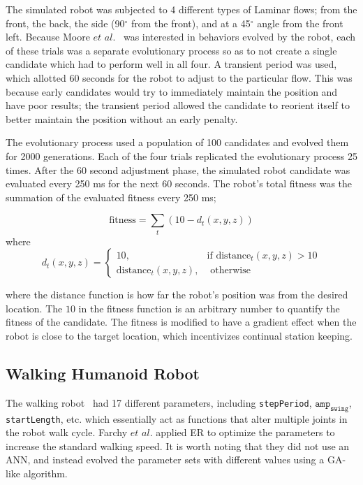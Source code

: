 \documentclass{sig-alternate}
\begin{document}
 The simulated robot was subjected to 4 different types of Laminar flows; from the front, the back, the side (90$^\circ$ from the front), and at a 45$^\circ$ angle from the front left. Because Moore $et$ $al.$~\cite{Moore:2013:ESK:2463372.2463402} was interested in behaviors evolved by the robot, each of these trials was a separate evolutionary process so as to not create a single candidate which had to perform well in all four. A transient period was used, which allotted 60 seconds for the robot to adjust to the particular flow. This was because early candidates would try to immediately maintain the position and have poor results; the transient period allowed the candidate to reorient itself to better maintain the position without an early penalty. 
 
 The evolutionary process used a population of 100 candidates and evolved them for 2000 generations. Each of the four trials replicated the evolutionary process 25 times. After the 60 second adjustment phase, the simulated robot candidate was evaluated every 250 ms for the next 60 seconds. The robot's total fitness was the summation of the evaluated fitness every 250 ms;

\begin{equation*}
	\textrm{fitness} = \sum_{t} (10 - d_t(x, y, z))
\end{equation*}
where
\[
	d_t(x, y, z) = 
		\begin{cases} 10, & \textrm{if distance}_t(x, y, z) > 10 \\
					  \textrm{distance}_t(x, y, z), & \textrm{ otherwise}
		\end{cases}
\]
 
 
  where the distance function is how far the robot's position was from the desired location. The $10$ in the fitness function is an arbitrary number to quantify the fitness of the candidate. The fitness is modified to have a gradient effect when the robot is close to the target location, which incentivizes continual station keeping.  
 
  \subsection{Walking Humanoid Robot}\label{Farchy Evolving}
  The walking robot~\cite{Farchy:2013:HRL:2484920.2484930} had 17 different parameters, including \texttt{stepPeriod}, $\texttt{amp}_\texttt{swing}$, \texttt{startLength}, etc. which essentially act as functions that alter multiple joints in the robot walk cycle. Farchy $et$ $al.$ applied ER to optimize the parameters to increase the standard walking speed. It is worth noting that they did not use an ANN, and instead evolved the parameter sets with different values using a GA-like algorithm.
 
\end{document}
